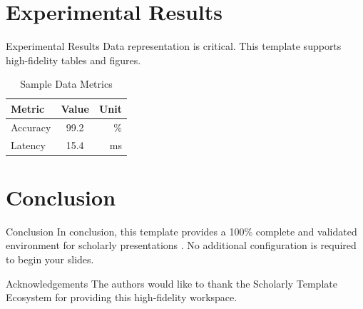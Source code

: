 ﻿\documentclass{beamer}
\begin{document}
\section{Experimental Results}
\begin{frame}{Experimental Results}
  Data representation is critical. This template supports high-fidelity tables and figures.

  \begin{table}
  \centering
  \caption{Sample Data Metrics}
  \begin{tabular}{lcr}
  \toprule
  Metric & Value & Unit \\
  \midrule
  Accuracy & 99.2 & \% \\
  Latency & 15.4 & ms \\
  \bottomrule
  \end{tabular}
  \end{table}
\end{frame}

\section{Conclusion}
\begin{frame}{Conclusion}
  In conclusion, this template provides a 100\% complete and validated environment for scholarly presentations \citep{knuth1984}. No additional configuration is required to begin your slides.
\end{frame}

\begin{frame}{Acknowledgements}
  The authors would like to thank the Scholarly Template Ecosystem for providing this high-fidelity workspace.
\end{frame}



\end{document}
